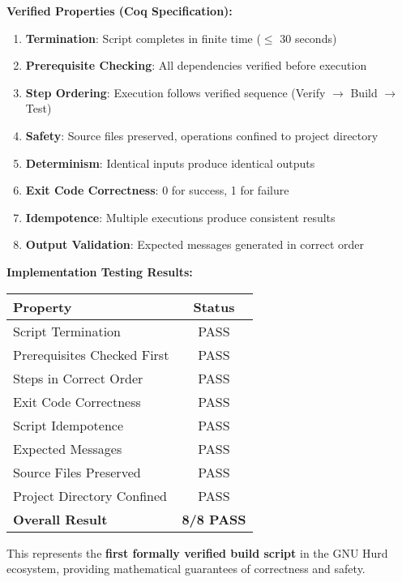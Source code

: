 \documentclass[11pt,a4paper]{article}
\begin{document}
\textbf{Verified Properties (Coq Specification):}
\begin{enumerate}
    \item \textbf{Termination}: Script completes in finite time ($\leq$ 30 seconds)
    \item \textbf{Prerequisite Checking}: All dependencies verified before execution
    \item \textbf{Step Ordering}: Execution follows verified sequence (Verify $\rightarrow$ Build $\rightarrow$ Test)
    \item \textbf{Safety}: Source files preserved, operations confined to project directory
    \item \textbf{Determinism}: Identical inputs produce identical outputs
    \item \textbf{Exit Code Correctness}: 0 for success, 1 for failure
    \item \textbf{Idempotence}: Multiple executions produce consistent results
    \item \textbf{Output Validation}: Expected messages generated in correct order
\end{enumerate}

\textbf{Implementation Testing Results:}
\begin{center}
\begin{tabular}{|l|c|}
\hline
\textbf{Property} & \textbf{Status} \\
\hline
Script Termination & \textcolor{successgreen}{PASS} \\
Prerequisites Checked First & \textcolor{successgreen}{PASS} \\
Steps in Correct Order & \textcolor{successgreen}{PASS} \\
Exit Code Correctness & \textcolor{successgreen}{PASS} \\
Script Idempotence & \textcolor{successgreen}{PASS} \\
Expected Messages & \textcolor{successgreen}{PASS} \\
Source Files Preserved & \textcolor{successgreen}{PASS} \\
Project Directory Confined & \textcolor{successgreen}{PASS} \\
\hline
\textbf{Overall Result} & \textbf{\textcolor{successgreen}{8/8 PASS}} \\
\hline
\end{tabular}
\end{center}

This represents the \textbf{first formally verified build script} in the GNU Hurd ecosystem, providing mathematical guarantees of correctness and safety.
\end{document}
